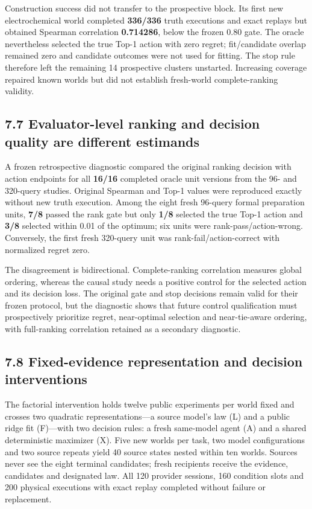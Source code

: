 \documentclass[10pt,twocolumn]{article}
\begin{document}
Construction success did not transfer to the prospective block. Its
first new electrochemical world completed \textbf{336/336} truth
executions and exact replays but obtained Spearman correlation
\textbf{0.714286}, below the frozen 0.80 gate. The oracle nevertheless
selected the true Top-1 action with zero regret; fit/candidate overlap
remained zero and candidate outcomes were not used for fitting. The stop
rule therefore left the remaining 14 prospective clusters unstarted.
Increasing coverage repaired known worlds but did not establish
fresh-world complete-ranking validity.

\subsection{7.7 Evaluator-level ranking and decision quality are
different
estimands}\label{evaluator-level-ranking-and-decision-quality-are-different-estimands}

A frozen retrospective diagnostic compared the original ranking decision
with action endpoints for all \textbf{16/16} completed oracle unit
versions from the 96- and 320-query studies. Original Spearman and Top-1
values were reproduced exactly without new truth execution. Among the
eight fresh 96-query formal preparation units, \textbf{7/8} passed the
rank gate but only \textbf{1/8} selected the true Top-1 action and
\textbf{3/8} selected within 0.01 of the optimum; six units were
rank-pass/action-wrong. Conversely, the first fresh 320-query unit was
rank-fail/action-correct with normalized regret zero.

The disagreement is bidirectional. Complete-ranking correlation measures
global ordering, whereas the causal study needs a positive control for
the selected action and its decision loss. The original gate and stop
decisions remain valid for their frozen protocol, but the diagnostic
shows that future control qualification must prospectively prioritize
regret, near-optimal selection and near-tie-aware ordering, with
full-ranking correlation retained as a secondary diagnostic.

\subsection{7.8 Fixed-evidence representation and decision
interventions}\label{fixed-evidence-representation-and-decision-interventions}

The factorial intervention holds twelve public experiments per world
fixed and crosses two quadratic representations---a source model's law
(L) and a public ridge fit (F)---with two decision rules: a fresh
same-model agent (A) and a shared deterministic maximizer (X). Five new
worlds per task, two model configurations and two source repeats yield
40 source states nested within ten worlds. Sources never see the eight
terminal candidates; fresh recipients receive the evidence, candidates
and designated law. All 120 provider sessions, 160 condition slots and
200 physical executions with exact replay completed without failure or
replacement.
\end{document}
